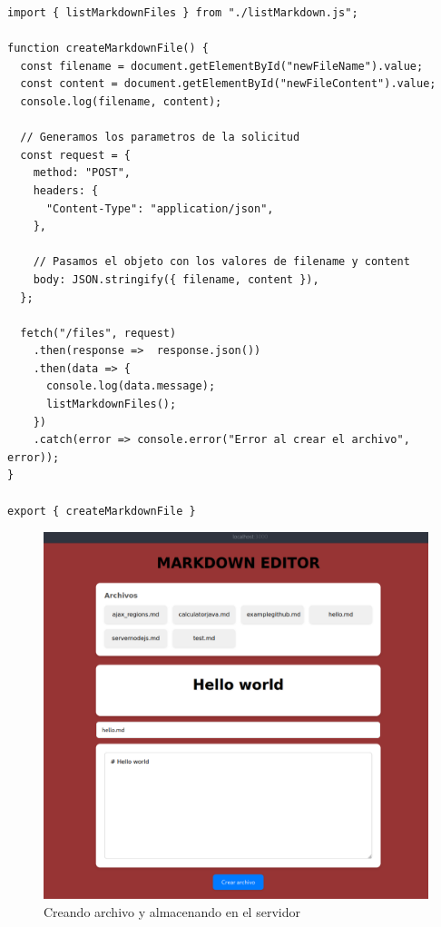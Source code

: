 \begin{verbatim}
import { listMarkdownFiles } from "./listMarkdown.js";

function createMarkdownFile() {
  const filename = document.getElementById("newFileName").value;
  const content = document.getElementById("newFileContent").value;
  console.log(filename, content);

  // Generamos los parametros de la solicitud
  const request = {
    method: "POST",
    headers: {
      "Content-Type": "application/json",
    },
    
    // Pasamos el objeto con los valores de filename y content
    body: JSON.stringify({ filename, content }),
  };
  
  fetch("/files", request)
    .then(response =>  response.json())
    .then(data => {
      console.log(data.message);
      listMarkdownFiles();
    })
    .catch(error => console.error("Error al crear el archivo", error));
}

export { createMarkdownFile }
\end{verbatim}

\begin{figure}[H]
  \centering
  \includegraphics[width=1.0\textwidth]{img/create_markdown.png}
  \caption{Creando archivo y almacenando en el servidor}
\end{figure}

